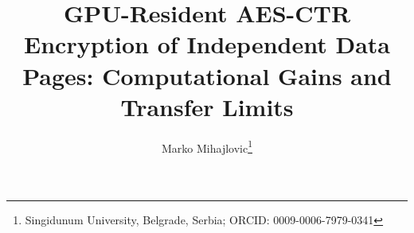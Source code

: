 \title{GPU-Resident AES-CTR Encryption of Independent Data Pages: Computational Gains and Transfer Limits}
\author{Marko Mihajlovic\thanks{Singidunum University, Belgrade, Serbia; ORCID:
0009-0006-7979-0341}}
\date{}
